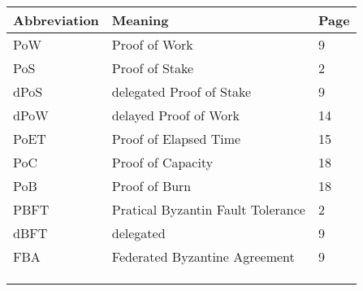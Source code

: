 \documentclass[]{article}
\begin{document}
\begin{CJK*}{UTF8}{gbsn}
\begin{tabular}{lll}
\hline
Abbreviation & Meaning  & Page  \\ \hline
PoW & Proof of Work & 9 \\ 
PoS & Proof of Stake & 2 \\ 
dPoS & delegated Proof of Stake & 9 \\ 
dPoW & delayed Proof of Work & 14 \\ 
PoET & Proof of Elapsed Time  & 15 \\ 
PoC & Proof of Capacity & 18 \\ 
PoB & Proof of Burn & 18 \\ 
PBFT & Pratical Byzantin Fault Tolerance & 2 \\ 
dBFT & delegated  & 9 \\ 
FBA & Federated Byzantine Agreement & 9 \\ 
 &  &  \\ 
 &  &  \\ 
 &  &  \\ 
\end{tabular}


\end{CJK*}
\end{document}
